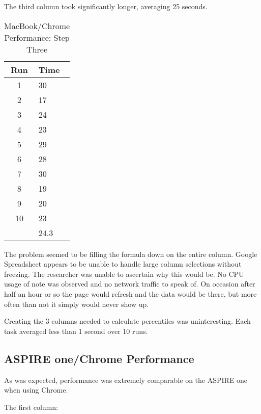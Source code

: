 The third column took significantly longer, averaging 25 seconds.

\begin{table}
  \begin{tabular}{| c | l |}
    \hline
    Run  & Time \\ \hline
    1    & 30   \\ \hline
    2    & 17   \\ \hline
    3    & 24   \\ \hline
    4    & 23   \\ \hline
    5    & 29   \\ \hline
    6    & 28   \\ \hline
    7    & 30   \\ \hline
    8    & 19   \\ \hline
    9    & 20   \\ \hline
    10   & 23   \\ \hline
    & 24.3 \\
    \hline
  \end{tabular}
  \caption{MacBook/Chrome Performance: Step Three}
  \label{mbChromePerf03}
\end{table}

The problem seemed to be filling the formula down on the entire column.  Google
Spreadsheet appears to be unable to handle large column selections without
freezing.  The researcher was unable to ascertain why this would be.  No CPU
usage of note was observed and no network traffic to speak of.  On occasion
after half an hour or so the page would refresh and the data would be there, but
more often than not it simply would never show up.

Creating the 3 columns needed to calculate percentiles was uninteresting.  Each
task averaged less than 1 second over 10 runs.

\subsection{ASPIRE one/Chrome Performance}

As was expected, performance was extremely comparable on the ASPIRE one when
using Chrome.

The first column:

